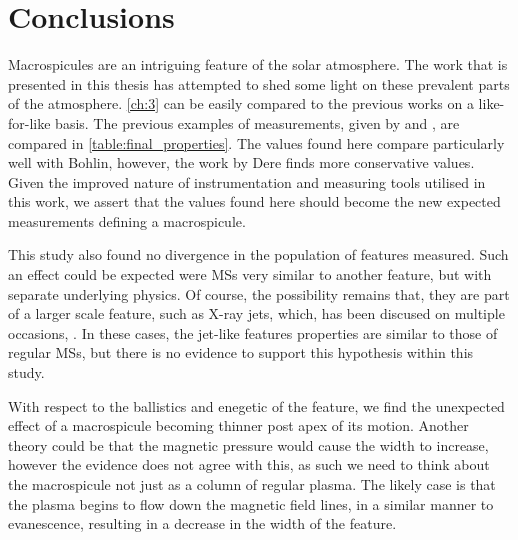 
\label{ch:conc}
\chapter{Conclusions}

Macrospicules are an intriguing feature of the solar atmosphere.
The work that is presented in this thesis has attempted to shed some light on these prevalent parts of the atmosphere.
\cref{ch:3} can be easily compared to the previous works on a like-for-like basis.
The previous examples of measurements, given by \cite{Bohlin1975} and \cite{Dere89}, are compared in \cref{table:final_properties}.
The values found here compare particularly well with Bohlin, however, the work by Dere finds more conservative values.
Given the improved nature of instrumentation and measuring tools utilised in this work, we assert that the values found here should become the new expected measurements defining a macrospicule.

This study also found no divergence in the population of features measured.
Such an effect could be expected were MSs very similar to another feature, but with separate underlying physics.
Of course, the possibility remains that, they are part of a larger scale feature, such as X-ray jets, which, has been discused on multiple occasions, \cite{Parenti2002, Kamio2010}.
In these cases, the jet-like features properties are similar to those of regular MSs, but there is no evidence to support this hypothesis within this study.   

With respect to the ballistics and enegetic of the feature, we find the unexpected effect of a macrospicule becoming thinner post apex of its motion.
Another theory could be that the magnetic pressure would cause the width to increase, however the evidence does not agree with this, as such we need to think about the macrospicule not just as a column of regular plasma.
The likely case is that the plasma begins to flow down the magnetic field lines, in a similar manner to evanescence, resulting in a decrease in the width of the feature.


